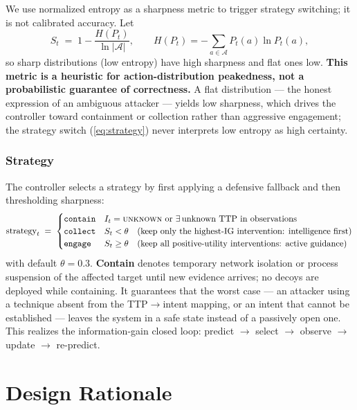 \documentclass[11pt]{article}
\newcommand{\act}[1]{\texttt{#1}}
\newcommand{\intent}[1]{\textsc{#1}}
\begin{document}
We use normalized entropy as a sharpness metric to trigger strategy
switching; it is not calibrated accuracy. Let
\begin{equation}
\label{eq:sharpness}
S_t \;=\; 1 - \frac{H(P_t)}{\ln |\mathcal{A}|},
\qquad
H(P_t) = -\sum_{a \in \mathcal{A}} P_t(a) \ln P_t(a),
\end{equation}
so sharp distributions (low entropy) have high sharpness and flat ones low.
\textbf{This metric is a heuristic for action-distribution peakedness, not a
probabilistic guarantee of correctness.} A flat distribution --- the honest
expression of an ambiguous attacker --- yields low sharpness, which drives
the controller toward containment or collection rather than aggressive
engagement; the strategy switch (\ref{eq:strategy}) never interprets low
entropy as high certainty.

\subsubsection{Strategy}
\label{sec:strategy}

The controller selects a strategy by first applying a defensive fallback
and then thresholding sharpness:
\begin{equation}
\label{eq:strategy}
\text{strategy}_t \;=\;
\begin{cases}
\act{contain} & I_t = \intent{unknown} \text{ or } \exists\, \text{unknown
TTP in observations} \\
\act{collect} & S_t < \theta \quad\text{(keep only the highest-IG
intervention: intelligence first)} \\
\act{engage} & S_t \geq \theta \quad\text{(keep all positive-utility
interventions: active guidance)}
\end{cases}
\end{equation}
with default $\theta = 0.3$. \textbf{Contain} denotes temporary network
isolation or process suspension of the affected target until new evidence
arrives; no decoys are deployed while containing. It guarantees that the
worst case --- an attacker using a technique absent from the TTP$\to$intent
mapping, or an intent that cannot be established --- leaves the system in a
safe state instead of a passively open one. This realizes the
information-gain closed loop: predict $\to$ select $\to$ observe $\to$
update $\to$ re-predict.

\section{Design Rationale}
\label{sec:rationale}
\end{document}

